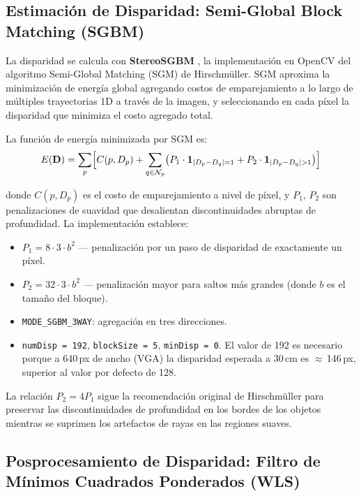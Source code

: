 \documentclass[12pt, a4paper]{article}
\begin{document}
\subsection{Estimación de Disparidad: Semi-Global Block Matching (SGBM)}

La disparidad se calcula con \textbf{StereoSGBM} \cite{hirschmuller2008stereo},
la implementación en OpenCV del algoritmo Semi-Global Matching (SGM) de Hirschmüller.
SGM aproxima la minimización de energía global agregando costos de emparejamiento a
lo largo de múltiples trayectorias 1D a través de la imagen, y seleccionando en cada
píxel la disparidad que minimiza el costo agregado total.

La función de energía minimizada por SGM es:
\begin{equation}
E(\mathbf{D}) = \sum_{p} \Bigl[
  C(p, D_p)
  + \sum_{q \in \mathcal{N}_p} \bigl(P_1 \cdot \mathbf{1}_{|D_p - D_q|=1}
    + P_2 \cdot \mathbf{1}_{|D_p - D_q|>1}\bigr)
\Bigr]
\end{equation}

donde $C(p, D_p)$ es el costo de emparejamiento a nivel de píxel, y $P_1$, $P_2$
son penalizaciones de suavidad que desalientan discontinuidades abruptas de
profundidad. La implementación establece:

\begin{itemize}[leftmargin=2em]
  \item $P_1 = 8 \cdot 3 \cdot b^2$ — penalización por un paso de disparidad de
        exactamente un píxel.
  \item $P_2 = 32 \cdot 3 \cdot b^2$ — penalización mayor para saltos más grandes
        (donde $b$ es el tamaño del bloque).
  \item \texttt{MODE\_SGBM\_3WAY}: agregación en tres direcciones.
  \item \texttt{numDisp = 192}, \texttt{blockSize = 5}, \texttt{minDisp = 0}.
        El valor de 192 es necesario porque a 640\,px de ancho (VGA) la disparidad
        esperada a 30\,cm es $\approx$\,146\,px, superior al valor por defecto de 128.
\end{itemize}

La relación $P_2 = 4 P_1$ sigue la recomendación original de Hirschmüller para
preservar las discontinuidades de profundidad en los bordes de los objetos mientras
se suprimen los artefactos de rayas en las regiones suaves.

\subsection{Posprocesamiento de Disparidad: Filtro de Mínimos Cuadrados Ponderados (WLS)}
\end{document}
